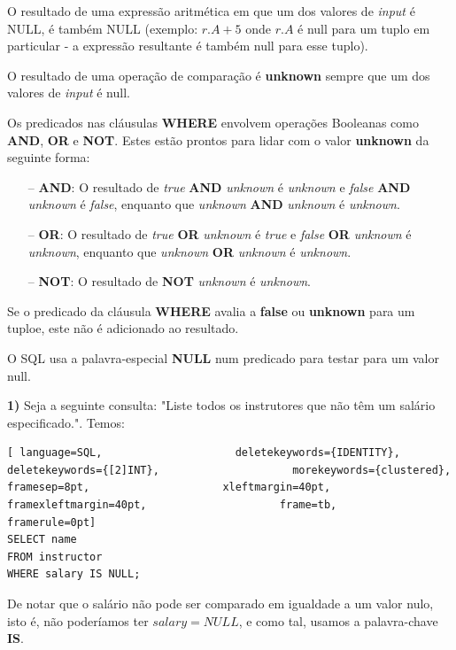 \documentclass[titlepage]{book}
\theoremstyle{definition}
\begin{document}
O resultado de uma expressão aritmética em que um dos valores de \textit{input} é NULL, é também NULL (exemplo: $r.A + 5$ onde $r.A$ é null para um tuplo em particular - a expressão resultante é também null para esse tuplo).

O resultado de uma operação de comparação é \textbf{unknown} sempre que um dos valores de \textit{input} é null.

Os predicados nas cláusulas \textbf{WHERE} envolvem operações Booleanas como \textbf{AND}, \textbf{OR} e \textbf{NOT}. Estes estão prontos para lidar com o valor \textbf{unknown} da seguinte forma:
\begin{itemize}
    \itemsep0cm
    \item[--]\textbf{AND}: O resultado de \textit{true} \textbf{AND} \textit{unknown} é \textit{unknown} e \textit{false} \textbf{AND} \textit{unknown} é \textit{false}, enquanto que \textit{unknown} \textbf{AND} \textit{unknown} é \textit{unknown}.
    \item[--]\textbf{OR}: O resultado de \textit{true} \textbf{OR} \textit{unknown} é \textit{true} e \textit{false} \textbf{OR} \textit{unknown} é \textit{unknown}, enquanto que \textit{unknown} \textbf{OR} \textit{unknown} é \textit{unknown}.
    \item[--]\textbf{NOT}: O resultado de \textbf{NOT} \textit{unknown} é \textit{unknown}.
\end{itemize}

Se o predicado da cláusula \textbf{WHERE} avalia a \textbf{false} ou \textbf{unknown} para um tuploe, este não é adicionado ao resultado.

O SQL usa a palavra-especial \textbf{NULL} num predicado para testar para um valor null.

\textbf{1)} Seja a seguinte consulta: "Liste todos os instrutores que não têm um salário especificado.". Temos:
\begin{lstlisting}[ language=SQL,                     deletekeywords={IDENTITY},                     deletekeywords={[2]INT},                     morekeywords={clustered},                     framesep=8pt,                     xleftmargin=40pt,                     framexleftmargin=40pt,                     frame=tb,                     framerule=0pt]
SELECT name
FROM instructor
WHERE salary IS NULL;
\end{lstlisting}

De notar que o salário não pode ser comparado em igualdade a um valor nulo, isto é, não poderíamos ter $salary = NULL$, e como tal, usamos a palavra-chave \textbf{IS}.
\end{document}
